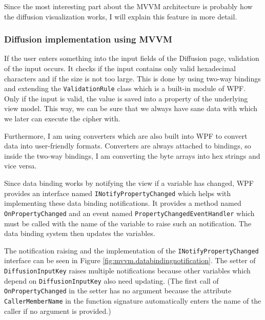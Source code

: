Since the most interesting part about the MVVM architecture is probably how the diffusion visualization works, I will explain this feature in more detail.

\subsubsection{Diffusion implementation using MVVM}

If the user enters something into the input fields of the Diffusion page, validation of the input occurs. It checks if the input contains only valid hexadecimal characters and if the size is not too large. This is done by using two-way bindings and extending the \texttt{ValidationRule} class which is a built-in module of WPF. Only if the input is valid, the value is saved into a property of the underlying view model. This way, we can be sure that we always have sane data with which we later can execute the cipher with.

Furthermore, I am using converters which are also built into WPF to convert data into user-friendly formats. Converters are always attached to bindings, so inside the two-way bindings, I am converting the byte arrays into hex strings and vice versa.

Since data binding works by notifying the view if a variable has changed, WPF provides an interface named \texttt{INotifyPropertyChanged} which helps with implementing these data binding notifications. It provides a method named \texttt{OnPropertyChanged} and  an event named \texttt{PropertyChangedEventHandler} which must be called with the name of the variable to raise such an notification. The data binding system then updates the variables.

The notification raising and the implementation of the \texttt{INotifyPropertyChanged} interface can be seen in Figure \ref{fig:mvvm.databindingnotification}. The setter of \texttt{DiffusionInputKey} raises multiple notifications because other variables which depend on \texttt{DiffusionInputKey} also need updating. (The first call of \texttt{OnPropertyChanged}  in the setter has no argument because the attribute \texttt{CallerMemberName} in the function signature automatically enters the name of the caller if no argument is provided.)

